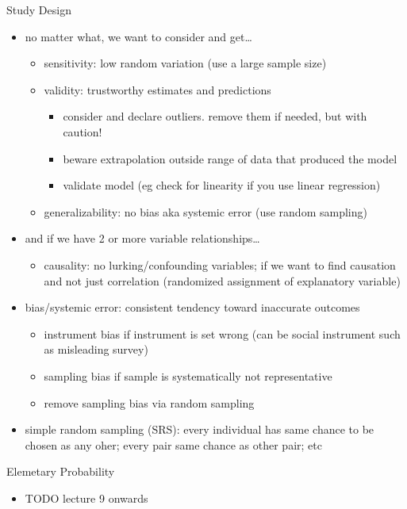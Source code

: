 \documentclass[11pt]{article}
\begin{document}
Study Design
\begin{itemize}
  \item no matter what, we want to consider and get\dots
  \begin{itemize}
    \item sensitivity: low random variation (use a large sample size)
    \item validity: trustworthy estimates and predictions
    \begin{itemize}
      \item consider and declare outliers. remove them if needed, but with caution!
      \item beware extrapolation outside range of data that produced the model
      \item validate model (eg check for linearity if you use linear regression)
    \end{itemize} 
    \item generalizability: no bias aka systemic error (use random sampling)
  \end{itemize}
  \item and if we have 2 or more variable relationships\dots
  \begin{itemize}
    \item causality: no lurking/confounding variables; if we want to find causation and not just correlation (randomized assignment of explanatory variable)
  \end{itemize}
  \item bias/systemic error: consistent tendency toward inaccurate outcomes
  \begin{itemize}
    \item instrument bias if instrument is set wrong (can be social instrument such as misleading survey)
    \item sampling bias if sample is systematically not representative 
    \item remove sampling bias via random sampling
  \end{itemize}
  \item simple random sampling (SRS): every individual has same chance to be chosen as any oher; every pair same chance as other pair; etc
\end{itemize}
Elemetary Probability
\begin{itemize}
  \item TODO lecture 9 onwards
\end{itemize}
\end{document}
